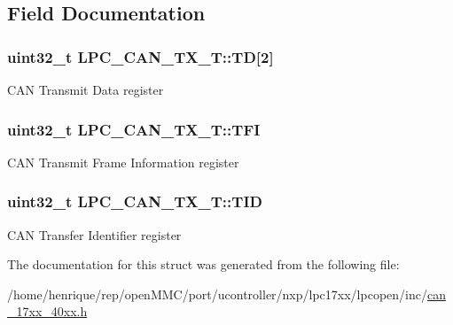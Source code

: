 \subsection{Field Documentation}
\hypertarget{structLPC__CAN__TX__T_ab41475b9f2b0952da4e71f74cfe33c20}{
\subsubsection[{T\-D}]{ uint32\-\_\-t L\-P\-C\-\_\-\-C\-A\-N\-\_\-\-T\-X\-\_\-\-T\-::\-T\-D\mbox{[}2\mbox{]}}}\label{structLPC__CAN__TX__T_ab41475b9f2b0952da4e71f74cfe33c20}
C\-A\-N Transmit Data register \hypertarget{structLPC__CAN__TX__T_a10a4c2076dd63148d4e9e4ad32af1451}{
\subsubsection[{T\-F\-I}]{ uint32\-\_\-t L\-P\-C\-\_\-\-C\-A\-N\-\_\-\-T\-X\-\_\-\-T\-::\-T\-F\-I}}\label{structLPC__CAN__TX__T_a10a4c2076dd63148d4e9e4ad32af1451}
C\-A\-N Transmit Frame Information register \hypertarget{structLPC__CAN__TX__T_a7a98a061fcb602592c5b6a17810a42c3}{
\subsubsection[{T\-I\-D}]{ uint32\-\_\-t L\-P\-C\-\_\-\-C\-A\-N\-\_\-\-T\-X\-\_\-\-T\-::\-T\-I\-D}}\label{structLPC__CAN__TX__T_a7a98a061fcb602592c5b6a17810a42c3}
C\-A\-N Transfer Identifier register 

The documentation for this struct was generated from the following file\-:\begin{DoxyCompactItemize}
\item 
/home/henrique/rep/open\-M\-M\-C/port/ucontroller/nxp/lpc17xx/lpcopen/inc/\hyperlink{can__17xx__40xx_8h}{can\-\_\-17xx\-\_\-40xx.\-h}\end{DoxyCompactItemize}
